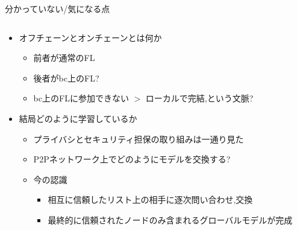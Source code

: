 \documentclass[unicode,12pt,aspectratio=169, dvipdfmx]{beamer}
\begin{document}
    \begin{frame}{分かっていない/気になる点}
        \begin{columns}
            \begin{column}{.8\linewidth}
                \begin{itemize}
                    \item オフチェーンとオンチェーンとは何か
                    \begin{itemize}
                        \item 前者が通常のFL
                        \item 後者がbc上のFL?
                        \item bc上のFLに参加できない $>$ ローカルで完結,という文脈?
                    \end{itemize}
                    \item 結局どのように学習しているか   
                    \begin{itemize}
                        \item プライバシとセキュリティ担保の取り組みは一通り見た
                        \item P2Pネットワーク上でどのようにモデルを交換する?
                        \item 今の認識
                        \begin{itemize}
                            \item 相互に信頼したリスト上の相手に逐次問い合わせ,交換
                        \item 最終的に信頼されたノードのみ含まれるグローバルモデルが完成
                        \end{itemize}
                    \end{itemize}
                \end{itemize}          
            \end{column}
        \end{columns}
    \end{frame}
\end{document}
